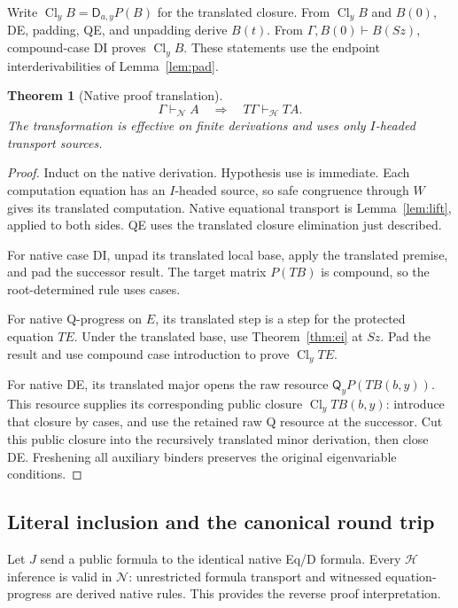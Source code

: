 \documentclass[11pt,letterpaper]{article}
\newtheorem{theorem}{Theorem}[section]
\theoremstyle{definition}\newtheorem{definition}[theorem]{Definition}
\theoremstyle{remark}\newtheorem{remark}[theorem]{Remark}
\newcommand{\D}{\mathsf D}\newcommand{\Q}{\mathsf Q}
\newcommand{\Hcal}{\mathcal H}\newcommand{\Kcal}{\mathcal K}
\newcommand{\Ncal}{\mathcal N}\newcommand{\Pcal}{\mathcal P}
\begin{document}
Write \(\operatorname{Cl}_y B=\D_{a,y}P(B)\) for the translated
closure. From \(\operatorname{Cl}_yB\) and \(B(0)\), DE, padding,
QE, and unpadding derive \(B(t)\). From
\(\Gamma,B(0)\vdash B(Sz)\), compound-case DI proves
\(\operatorname{Cl}_yB\). These statements use the endpoint
interderivabilities of Lemma~\ref{lem:pad}.

\begin{theorem}[Native proof translation]\label{thm:translate}
\[
 \Gamma\vdash_{\Ncal}A\quad\Longrightarrow\quad
 T\Gamma\vdash_{\Hcal}TA.
\]
The transformation is effective on finite derivations and uses only
\(I\)-headed transport sources.
\end{theorem}
\begin{proof}
Induct on the native derivation. Hypothesis use is immediate. Each
computation equation has an \(I\)-headed source, so safe congruence
through \(W\) gives its translated computation. Native equational
transport is Lemma~\ref{lem:lift}, applied to both sides. QE uses
the translated closure elimination just described.

For native case DI, unpad its translated local base, apply the
translated premise, and pad the successor result. The target matrix
\(P(TB)\) is compound, so the root-determined rule uses cases.

For native Q-progress on \(E\), its translated step is a step for
the protected equation \(TE\). Under the translated base, use
Theorem~\ref{thm:ei} at \(Sz\). Pad the result and use compound
case introduction to prove \(\operatorname{Cl}_yTE\).

For native DE, its translated major opens the raw resource
\(\Q_yP(TB(b,y))\). This resource supplies its corresponding public
closure \(\operatorname{Cl}_yTB(b,y)\): introduce that closure by
cases, and use the retained raw Q resource at the successor. Cut this
public closure into the recursively translated minor derivation, then
close DE. Freshening all auxiliary binders preserves the original
eigenvariable conditions.
\end{proof}

\subsection{Literal inclusion and the canonical round trip}

Let \(J\) send a public formula to the identical native Eq/D formula.
Every \(\Hcal\) inference is valid in \(\Ncal\): unrestricted
formula transport and witnessed equation-progress are derived native
rules. This provides the reverse proof interpretation.
\end{document}
